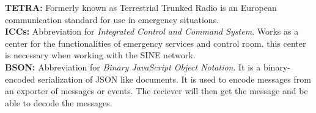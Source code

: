 \noindent \textbf{TETRA:} Formerly known as Terrestrial Trunked Radio is an European communication standard for use in emergency situations.\\

\noindent \textbf{ICCs:} Abbreviation for \textit{Integrated Control and Command System}. Works as a center for the functionalities of emergency services and control room. this center is necessary when working with the SINE network.\\

\noindent \textbf{BSON:} Abbreviation for \textit{Binary JavaScript Object Notation}. It is a binary-encoded serialization of JSON like documents. It is used to encode messages from an exporter of messages or events. The reciever will then get the message and be able to decode the messages.  \\

